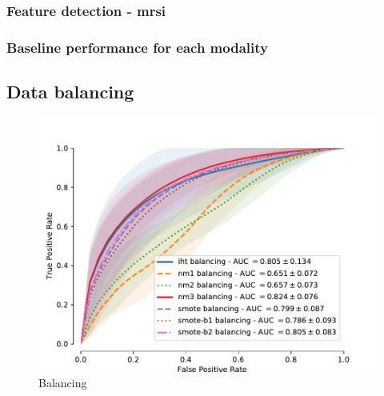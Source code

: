 \documentclass[a4paper,num-refs]{wiley-article}
\begin{document}
\subsubsection{Feature detection - \Ac{mrsi}}

\begin{figure}
  \hspace*{\fill}
  \hfill
  \hspace*{\fill}
  \caption[]{}
  \label{fig:xxx}
\end{figure}

\subsubsection{Baseline performance for each modality}

\subsection{Data balancing}

\begin{figure}
  \centering
  \includegraphics[width=0.5\linewidth]{images/aggregation.pdf}
  \caption[Balancing]{Balancing}
  \label{fig:balancing}
\end{figure}
\end{document}
